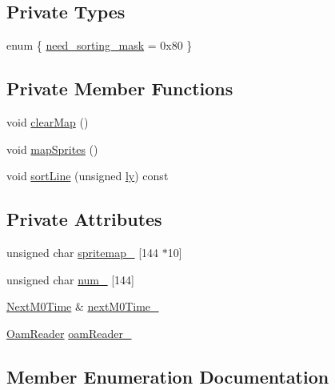 \subsection*{Private Types}
\begin{DoxyCompactItemize}
\item 
enum \{ \hyperlink{classgambatte_1_1SpriteMapper_a523804247b052cc0c961255e4dd20ce8af390b53d20749943c37e1f9c84a9a01e}{need\+\_\+sorting\+\_\+mask} = 0x80
 \}
\end{DoxyCompactItemize}
\subsection*{Private Member Functions}
\begin{DoxyCompactItemize}
\item 
void \hyperlink{classgambatte_1_1SpriteMapper_a65e513f3c368d2ba0dac2a9625edc57a}{clear\+Map} ()
\item 
void \hyperlink{classgambatte_1_1SpriteMapper_a98f85e5f98730495f6a1648268f03a2a}{map\+Sprites} ()
\item 
void \hyperlink{classgambatte_1_1SpriteMapper_aeaa3e4b1f02ec1f6a4fc99d0dd44a54b}{sort\+Line} (unsigned \hyperlink{video_8cpp_ab1c1cf762ec2da5588c30a13cd60af91}{ly}) const
\end{DoxyCompactItemize}
\subsection*{Private Attributes}
\begin{DoxyCompactItemize}
\item 
unsigned char \hyperlink{classgambatte_1_1SpriteMapper_aaf20b8b09e7eabc2ad3051b4bcbb7470}{spritemap\+\_\+} \mbox{[}144 $\ast$10\mbox{]}
\item 
unsigned char \hyperlink{classgambatte_1_1SpriteMapper_a8208222a16c3164b7b8de51cfc0e7727}{num\+\_\+} \mbox{[}144\mbox{]}
\item 
\hyperlink{classgambatte_1_1NextM0Time}{Next\+M0\+Time} \& \hyperlink{classgambatte_1_1SpriteMapper_ab953c5641f686e70c1ff6114ed8d12fa}{next\+M0\+Time\+\_\+}
\item 
\hyperlink{classgambatte_1_1SpriteMapper_1_1OamReader}{Oam\+Reader} \hyperlink{classgambatte_1_1SpriteMapper_a66612bed9813c478ed12879b6c8afd4a}{oam\+Reader\+\_\+}
\end{DoxyCompactItemize}


\subsection{Member Enumeration Documentation}
\mbox{\label{classgambatte_1_1SpriteMapper_a523804247b052cc0c961255e4dd20ce8}} 
